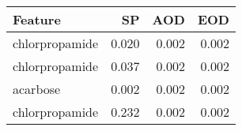 \begin{tabular}{lrrr}
\toprule
Feature & SP & AOD & EOD \\
\midrule
chlorpropamide & 0.020 & 0.002 & 0.002 \\
chlorpropamide & 0.037 & 0.002 & 0.002 \\
acarbose & 0.002 & 0.002 & 0.002 \\
chlorpropamide & 0.232 & 0.002 & 0.002 \\
\bottomrule
\end{tabular}
